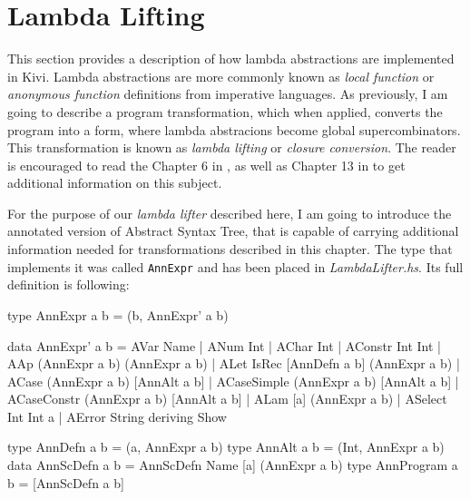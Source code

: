 \documentclass[12pt,a4paper]{report}
\begin{document}

\section{Lambda Lifting}
\label{sec:lambda_lifting}
This section provides a description of how lambda abstractions are implemented
in Kivi. Lambda abstractions are more commonly known as \textit{local function}
or \textit{anonymous function} definitions from imperative languages. As
previously, I am going to describe a program transformation, which when
applied, converts the program into a form, where lambda abstracions become
global supercombinators. This transformation is known as \textit{lambda
lifting} or \textit{closure conversion}. The reader is encouraged to read the
Chapter 6 in \cite{JonLes00}, as well as Chapter 13 in \cite{Jon87} to get
additional information on this subject.

For the purpose of our \textit{lambda lifter} described here, I am going to
introduce the annotated version of Abstract Syntax Tree, that is capable of
carrying additional information needed for transformations described in this
chapter. The type that implements it was called \texttt{AnnExpr} and has
been placed in \textit{LambdaLifter.hs}. Its full definition is following:

\vspace*{0.2in}
\begin{code}[style=haskell,label=lst:annotated_expression]
type AnnExpr a b = (b, AnnExpr' a b)

data AnnExpr' a b = AVar Name
                  | ANum Int
                  | AChar Int
                  | AConstr Int Int
                  | AAp (AnnExpr a b) (AnnExpr a b)
                  | ALet IsRec [AnnDefn a b] (AnnExpr a b)
                  | ACase (AnnExpr a b) [AnnAlt a b]
                  | ACaseSimple (AnnExpr a b) [AnnAlt a b]
                  | ACaseConstr (AnnExpr a b) [AnnAlt a b]
                  | ALam [a] (AnnExpr a b)
                  | ASelect Int Int a
                  | AError String
    deriving Show

type AnnDefn a b = (a, AnnExpr a b)
type AnnAlt a b = (Int, AnnExpr a b)
data AnnScDefn a b = AnnScDefn Name [a] (AnnExpr a b)
type AnnProgram a b = [AnnScDefn a b]
\end{code}
\end{document}
